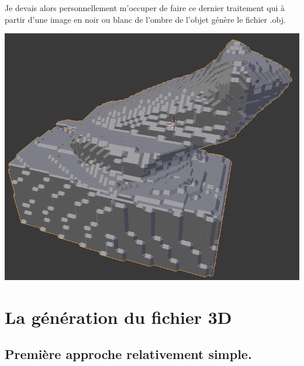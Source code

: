 \documentclass{article}
\begin{document}
Je devais alors personnellement m'occuper de faire ce dernier traitement
qui à partir d'une image en noir ou blanc de l'ombre de l'objet génère 
le fichier .obj.

\includegraphics[scale=0.25]{9}

\section*{La génération du fichier 3D}

\subsection*{Première approche relativement simple.}
\end{document}
